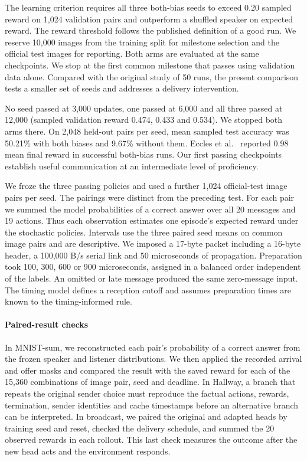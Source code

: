 \documentclass[pdflatex,sn-mathphys-num]{sn-jnl}
\begin{document}
The learning criterion requires all three both-bias seeds to exceed 0.20 sampled reward on 1,024 validation pairs and outperform a shuffled speaker on expected reward. The reward threshold follows the published definition of a good run. We reserve 10,000 images from the training split for milestone selection and the official test images for reporting. Both arms are evaluated at the same checkpoints. We stop at the first common milestone that passes using validation data alone. Compared with the original study of 50 runs, the present comparison tests a smaller set of seeds and addresses a delivery intervention.

No seed passed at 3,000 updates, one passed at 6,000 and all three passed at 12,000 (sampled validation reward 0.474, 0.433 and 0.534). We stopped both arms there. On 2,048 held-out pairs per seed, mean sampled test accuracy was 50.21\% with both biases and 9.67\% without them. Eccles et al.~\citep{eccles2019biases} reported 0.98 mean final reward in successful both-bias runs. Our first passing checkpoints establish useful communication at an intermediate level of proficiency.

We froze the three passing policies and used a further 1,024 official-test image pairs per seed. The pairings were distinct from the preceding test. For each pair we summed the model probabilities of a correct answer over all 20 messages and 19 actions. Thus each observation estimates one episode's expected reward under the stochastic policies. Intervals use the three paired seed means on common image pairs and are descriptive. We imposed a 17-byte packet including a 16-byte header, a 100,000 B/s serial link and 50 microseconds of propagation. Preparation took 100, 300, 600 or 900 microseconds, assigned in a balanced order independent of the labels. An omitted or late message produced the same zero-message input. The timing model defines a reception cutoff and assumes preparation times are known to the timing-informed rule.

\paragraph{Paired-result checks}
In MNIST-sum, we reconstructed each pair's probability of a correct answer from the frozen speaker and listener distributions. We then applied the recorded arrival and offer masks and compared the result with the saved reward for each of the 15,360 combinations of image pair, seed and deadline. In Hallway, a branch that repeats the original sender choice must reproduce the factual actions, rewards, termination, sender identities and cache timestamps before an alternative branch can be interpreted. In broadcast, we paired the original and adapted heads by training seed and reset, checked the delivery schedule, and summed the 20 observed rewards in each rollout. This last check measures the outcome after the new head acts and the environment responds.
\end{document}
